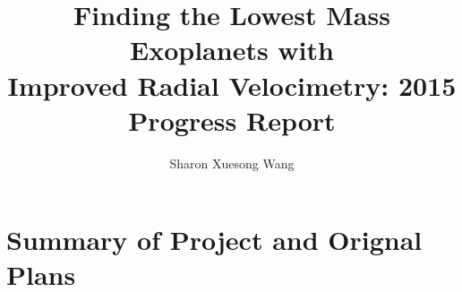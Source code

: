\documentclass[12pt]{article}
\begin{document}

\title{\vspace{-45pt} \bf \Large Finding the Lowest Mass Exoplanets with
  \\ Improved Radial Velocimetry: 2015 Progress Report \vspace{-15pt}}
\author{\normalsize Sharon Xuesong Wang}
\date{}
\maketitle

\vspace{-40pt}
\section{Summary of Project and Orignal Plans}
\vspace{-5pt}
\end{document}
